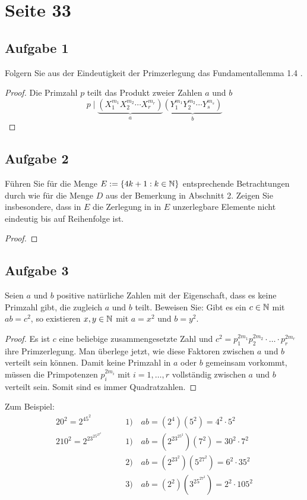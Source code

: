 \section{Seite 33}

\subsection{Aufgabe 1}
Folgern Sie aus der Eindeutigkeit der Primzerlegung das Fundamentallemma 1.4
\parencite[26]{book:zahlentheorie}.
\begin{proof}
  Die Primzahl $p$ teilt das Produkt zweier Zahlen $a$ und $b$
  \begin{equation*}
    p \mid \underbrace{(X_1^{m_1} X_2^{m_2} \dotsm X_r^{m_r})}_a
    \underbrace{(Y_1^{m_1} Y_2^{m_2} \dotsm Y_s^{m_s})}_b
  \end{equation*}
\end{proof}

\subsection{Aufgabe 2}
Führen Sie für die Menge $E :={} \{4k + 1 : k \in \mathbb{N}{}\}$ entsprechende
Betrachtungen durch wie für die Menge $D$ aus der Bemerkung in Abschnitt 2.
Zeigen Sie insbesondere, dass in $E$ die Zerlegung in in $E$
unzerlegbare Elemente nicht eindeutig bis auf Reihenfolge ist.
\begin{proof}
\end{proof}

\subsection{Aufgabe 3}
Seien $a$ und $b$ positive natürliche Zahlen mit der Eigenschaft, dass
es keine Primzahl gibt, die zugleich $a$ und $b$ teilt. Beweisen Sie:
Gibt es ein $c \in \mathbb{N}{}$ mit $ab = c^2$, so
existieren $x,y \in \mathbb{N}{}$ mit $a = x^2$ und $b = y^2$.
\begin{proof}
  Es ist $c$ eine beliebige zusammengesetzte Zahl und
  $c^2 = p_1^{2m_1}p_2^{2m_2} \cdot \ldots \cdot p_r^{2m_r}$
  ihre Primzerlegung. Man überlege jetzt,
  wie diese Faktoren zwischen $a$ und $b$ verteilt sein können.
  Damit keine Primzahl in $a$ oder $b$ gemeinsam vorkommt, müssen die
  Primpotenzen $p_i^{2m_i}$ mit $i = 1,\dotsc,r$ vollständig zwischen
  $a$ und $b$ verteilt sein. Somit sind es immer Quadratzahlen.
\end{proof}
\noindent
Zum Beispiel:
\begin{align*}
  20^2 = 2^45^2 \qquad        & 1) \quad ab = (2^4)(5^2) = 4^2 \cdot 5^2         \\[8pt]
  210^2 = 2^23^25^27^2 \qquad & 1) \quad ab = (2^23^25^2)(7^2) = 30^2 \cdot 7^2  \\
                              & 2) \quad ab = (2^23^2)(5^27^2) = 6^2 \cdot 35^2  \\
                              & 3) \quad ab = (2^2)(3^25^27^2) = 2^2 \cdot 105^2
\end{align*}

